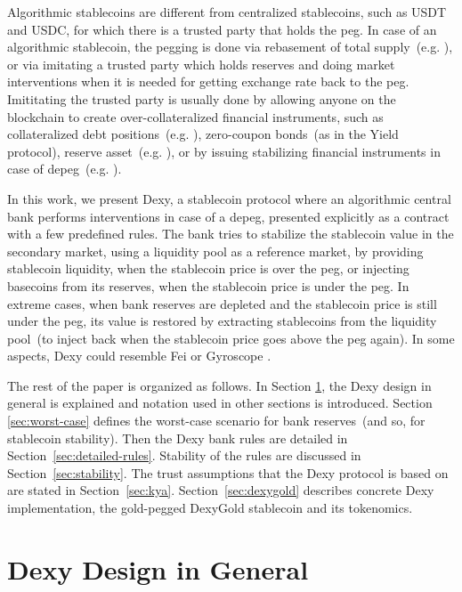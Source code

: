 \documentclass[a4paper,UKenglish,cleveref, autoref, thm-restate]{lipics-v2021}
\newcommand{\dx}{Dexy}
\begin{document}
Algorithmic stablecoins are different from centralized stablecoins, such as USDT and USDC, for which there is a trusted party that holds the peg. In case of an algorithmic stablecoin, the 
pegging is done via rebasement of total supply~(e.g. \cite{Ampleforth}), or via imitating a trusted party which holds reserves and doing market interventions when it is needed for getting exchange rate back to the peg. Imititating the trusted party is usually done by allowing anyone on the blockchain to create over-collateralized financial instruments, such as collateralized debt positions~(e.g. \cite{DAI}), zero-coupon bonds~(as in the Yield protocol), reserve asset~(e.g. \cite{DjedEprint,DjedICBC2023,Gluon}), or by issuing stabilizing financial instruments in case of depeg~(e.g. \cite{Neutrino}).

In this work, we present \dx{}, a stablecoin protocol where an algorithmic central bank performs interventions in case of a depeg, presented explicitly as a contract with a few predefined rules. The bank tries to stabilize the stablecoin value in the secondary market, using a liquidity pool as a reference market, by providing stablecoin liquidity, when the stablecoin price is over the peg, or injecting basecoins from its reserves, when the stablecoin price is under the peg. In extreme cases, when bank reserves are depleted and the stablecoin price is still under the peg, its value is restored by extracting stablecoins from the liquidity pool~(to inject back when the stablecoin price goes above the peg again). In some aspects, \dx{} could resemble Fei or Gyroscope \cite{Gyroscope}. 

The rest of the paper is organized as follows.  In Section \ref{sec:design-general}, the \dx{} design in general is explained and
notation used in other sections is introduced. Section \ref{sec:worst-case} defines the worst-case scenario for bank reserves~(and so, for stablecoin stability). Then the \dx{} bank rules are detailed in Section~\ref{sec:detailed-rules}. Stability of the rules are
discussed in Section~\ref{sec:stability}. The trust assumptions that the \dx{} protocol is based on are stated in Section~\ref{sec:kya}.
Section~\ref{sec:dexygold} describes concrete \dx{} implementation, the gold-pegged DexyGold stablecoin and its
tokenomics.

\section{\dx{} Design in General}
\label{sec:design-general}
\end{document}
